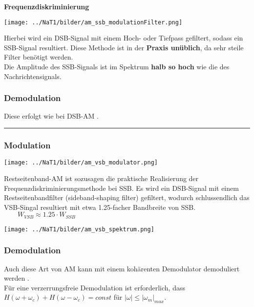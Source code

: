 \textbf{Frequenzdiskriminierung} \\
\begin{minipage}[t][2cm][c]{5.5cm}
    \texttt{[image: ../NaT1/bilder/am\_ssb\_modulationFilter.png]}
\end{minipage}
\begin{minipage}[t][2cm][c]{12.5cm}	
	Hierbei wird ein DSB-Signal mit einem Hoch- oder Tiefpass gefiltert, sodass ein SSB-Signal
	resultiert. Diese Methode ist in der \textbf{Praxis unüblich}, da sehr steile Filter benötigt
	werden.\\
	Die Amplitude des SSB-Signals ist im Spektrum \textbf{halb so hoch} wie die des
	Nachrichtensignals.
\end{minipage}

\subsubsection{Demodulation}
Diese erfolgt wie bei DSB-AM .\\

\hrule
{}
\subsubsection{Modulation}
\begin{minipage}[t][2.2cm][c]{5.5cm}
    \texttt{[image: ../NaT1/bilder/am\_vsb\_modulator.png]}
\end{minipage}
\begin{minipage}[t][2.2cm][c]{12.5cm}	
Restseitenband-AM ist sozusagen die praktische Realisierung der Frequenzdiskriminierungsmethode bei
SSB. Es wird ein DSB-Signal mit einem Restseitenbandfilter (sideband-shaping filter) gefiltert,
wodurch schlussendlich das VSB-Singal resultiert mit etwa 1.25-facher Bandbreite von SSB.
$ \qquad  W_{VSB} \approx 1.25 \cdot W_{SSB} $
\end{minipage}
\begin{center}
    \texttt{[image: ../NaT1/bilder/am\_vsb\_spektrum.png]}
\end{center}

\subsubsection{Demodulation}
Auch diese Art von AM kann mit einem kohärenten Demodulator demoduliert
werden .\\
Für eine verzerrungsfreie Demodulation ist erforderlich, dass $H(\omega +
\omega_c) + H(\omega - \omega_c) = const$ für $|\omega| \leq |\omega_m|_{max}$.

